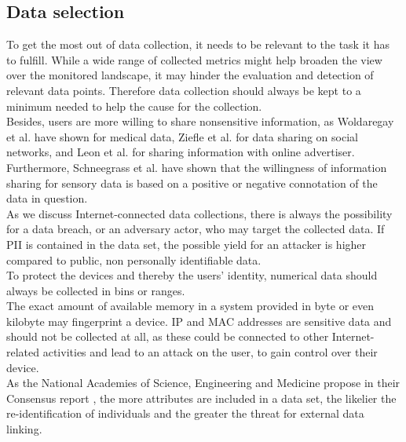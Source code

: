     \subsection{Data selection}
        \label{subsec:software_design:selection}
        To get the most out of data collection, it needs to be relevant to the task it has to fulfill.
        While a wide range of collected metrics might help  broaden the view over the monitored landscape, it may hinder the evaluation and detection of relevant data points. Therefore data collection should always be kept to a minimum needed to help the cause for the collection.\\
        Besides, users are more willing to share nonsensitive information, as Woldaregay et al.   \cite{woldaregay_user_2020} have shown for medical data, Ziefle et al.  \cite{ziefle_users_2016} for data sharing on social networks, and Leon et al.  \cite{leon_what_2013} for sharing information with online advertiser. Furthermore, Schneegrass et al.  \cite{10.1145/3290605.3300753} have shown that the willingness of information sharing for sensory data is based on a positive or negative connotation of the data in question.\\
        
        As we discuss Internet-connected data collections, there is always the possibility for a data breach, or an adversary actor, who may target the collected data. If PII is contained in the data set, the possible yield for an attacker is higher compared to public, non personally identifiable data.\\
        To protect the devices and thereby the users' identity, numerical data should always be collected in bins or ranges.\\
        The exact amount of available memory in a system provided in byte or even kilobyte may fingerprint a device. IP and MAC addresses are sensitive data and should not be collected at all, as these could be connected to other Internet-related activities and lead to an attack on the user, to gain control over their device. \\
        As the National Academies of Science, Engineering and Medicine propose in their Consensus report \cite{groves_federal_2017}, the more attributes are included in a data set, the likelier the re-identification of individuals and the greater the threat for external data linking.\\
        

